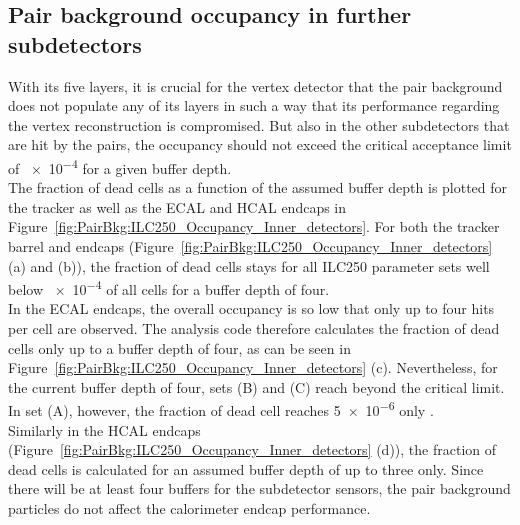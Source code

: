 \subsection{Pair background occupancy in further \sid subdetectors}
\label{PairBkg:further_subdetectors}

With its five layers, it is crucial for the vertex detector that the pair background does not populate any of its layers in such a way that its performance regarding the vertex reconstruction is compromised. 
But also in the other \sid subdetectors that are hit by the \positron\electron pairs, the occupancy should not exceed the critical acceptance limit of \num{e-4} for a given buffer depth.
\\The fraction of dead cells as a function of the assumed buffer depth is plotted for the \sid tracker as well as the ECAL and HCAL endcaps in Figure~\ref{fig:PairBkg:ILC250_Occupancy_Inner_detectors}.
For both the tracker barrel and endcaps (Figure~\ref{fig:PairBkg:ILC250_Occupancy_Inner_detectors} (a) and (b)), the fraction of dead cells stays for all ILC250 parameter sets well below \num{e-4} of all cells for a buffer depth of four.
\\In the ECAL endcaps, the overall occupancy is so low that only up to four hits per cell are observed.
The analysis code therefore calculates the fraction of dead cells only up to a buffer depth of four, as can be seen in Figure~\ref{fig:PairBkg:ILC250_Occupancy_Inner_detectors} (c).
Nevertheless, for the current buffer depth of four, sets (B) and (C) reach beyond the critical limit.
In set (A), however, the fraction of dead cell reaches \num{5e-6} only .
\\Similarly in the HCAL endcaps (Figure~\ref{fig:PairBkg:ILC250_Occupancy_Inner_detectors} (d)), the fraction of dead cells is calculated for an assumed buffer depth of up to three only.
Since there will be at least four buffers for the subdetector sensors, the pair background particles do not affect the calorimeter endcap performance.
